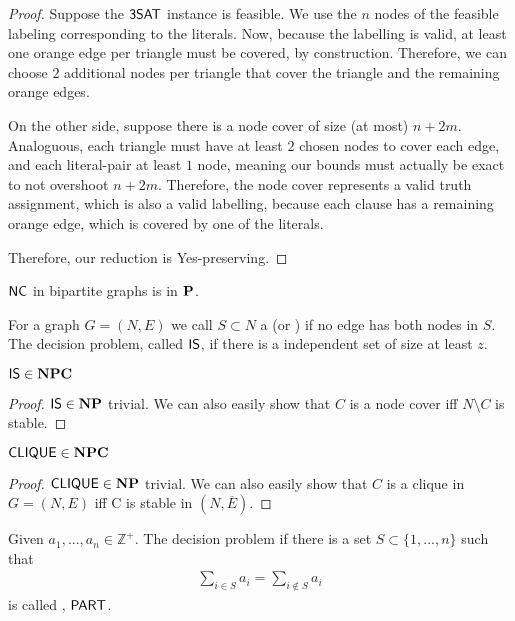 \begin{proof}
    Suppose the $\mathsf{3SAT}$ instance is feasible. We use the $n$ nodes of the feasible labeling corresponding to the literals.
    Now, because the labelling is valid, at least one orange edge per triangle must be covered, by construction.
    Therefore, we can choose $2$ additional nodes per triangle that cover the triangle and the remaining orange edges.

    On the other side, suppose there is a node cover of size (at most) $n+2m$.
    Analoguous, each triangle must have at least $2$ chosen nodes to cover each edge, and each literal-pair at least $1$ node,
    meaning our bounds must actually be exact to not overshoot $n+2m$. Therefore, the node cover represents a valid truth assignment,
    which is also a valid labelling, because each clause has a remaining orange edge, which is covered by
    one of the literals.

    Therefore, our reduction is Yes-preserving.
\end{proof}
\begin{remark}
    $\mathsf{NC}$ in bipartite graphs is in $\mathbf{P}$.
\end{remark}
\begin{definition}
    For a graph $G= (N,E)$ we call $S \subset N$ a  (or ) if no edge has both nodes in $S$.
    The decision problem, called $\mathsf{IS}$, if there is a independent set of size at least $z$.
\end{definition}
\begin{theorem}
    $\mathsf{IS} \in \mathbf{NPC}$
\end{theorem}
\begin{proof}
    $\mathsf{IS} \in \mathbf{NP}$ trivial. We can also easily show that $C$ is a node cover iff $N \setminus C$ is stable.
\end{proof}
\begin{theorem}
    $\mathsf{CLIQUE} \in \mathbf{NPC}$
\end{theorem}
\begin{proof}
    $\mathsf{CLIQUE} \in \mathbf{NP}$ trivial. We can also easily show that $C$ is a clique in $G=(N,E)$ iff
    C is stable in $(N, \overline{E})$.
\end{proof}
\begin{definition}
    Given $a_1,...,a_n \in \mathbb{Z^+}$. The decision problem if there is a set $S \subset \{1,...,n\}$ such that
    \begin{align*}
        \sum_{i \in S}a_i = \sum_{i \not \in S}a_i
    \end{align*}
    is called , $\mathsf{PART}$.
\end{definition}
